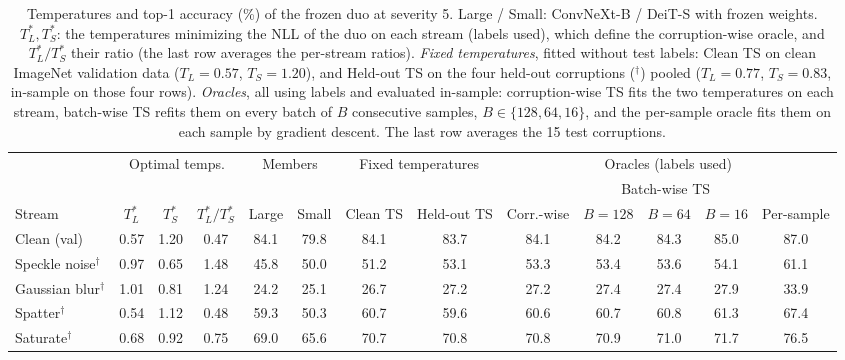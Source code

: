 \begin{table}[t]
    \centering
    \small
    \setlength{\tabcolsep}{4.5pt}
    \caption{Temperatures and top-1 accuracy (\%) of the frozen duo at severity 5. Large / Small: ConvNeXt-B / DeiT-S with frozen weights. $T_L^*, T_S^*$: the temperatures minimizing the NLL of the duo on each stream (labels used), which define the corruption-wise oracle, and $T_L^*/T_S^*$ their ratio (the last row averages the per-stream ratios). \emph{Fixed temperatures}, fitted without test labels: Clean TS on clean ImageNet validation data ($T_L = 0.57$, $T_S = 1.20$), and Held-out TS on the four held-out corruptions ($^\dagger$) pooled ($T_L = 0.77$, $T_S = 0.83$, in-sample on those four rows). \emph{Oracles}, all using labels and evaluated in-sample: corruption-wise TS fits the two temperatures on each stream, batch-wise TS refits them on every batch of $B$ consecutive samples, $B \in \{128, 64, 16\}$, and the per-sample oracle fits them on each sample by gradient descent. The last row averages the 15 test corruptions.}
    \label{tab:temperatures:frozen_bn__convnextb_deits}
    \label{tab:oracles:frozen_bn__convnextb_deits}
    \begin{tabular}{l|ccc|cc|cc|ccccc}
        \toprule
        & \multicolumn{3}{c|}{Optimal temps.} & \multicolumn{2}{c|}{Members} & \multicolumn{2}{c|}{Fixed temperatures} & \multicolumn{5}{c}{Oracles (labels used)} \\
         &  &  &  &  &  &  &  &  & \multicolumn{3}{c}{Batch-wise TS} &  \\
        \cmidrule(lr){10-12}
        Stream & $T_L^*$ & $T_S^*$ & $T_L^*/T_S^*$ & Large & Small & Clean TS & Held-out TS & Corr.-wise & $B{=}128$ & $B{=}64$ & $B{=}16$ & Per-sample \\
        \midrule
        Clean (val) & 0.57 & 1.20 & 0.47 & 84.1 & 79.8 & 84.1 & 83.7 & 84.1 & 84.2 & 84.3 & 85.0 & 87.0 \\
        \midrule
        Speckle noise$^\dagger$ & 0.97 & 0.65 & 1.48 & 45.8 & 50.0 & 51.2 & 53.1 & 53.3 & 53.4 & 53.6 & 54.1 & 61.1 \\
        Gaussian blur$^\dagger$ & 1.01 & 0.81 & 1.24 & 24.2 & 25.1 & 26.7 & 27.2 & 27.2 & 27.4 & 27.4 & 27.9 & 33.9 \\
        Spatter$^\dagger$ & 0.54 & 1.12 & 0.48 & 59.3 & 50.3 & 60.7 & 59.6 & 60.6 & 60.7 & 60.8 & 61.3 & 67.4 \\
        Saturate$^\dagger$ & 0.68 & 0.92 & 0.75 & 69.0 & 65.6 & 70.7 & 70.8 & 70.8 & 70.9 & 71.0 & 71.7 & 76.5 \\

\end{tabular}
\end{table}
